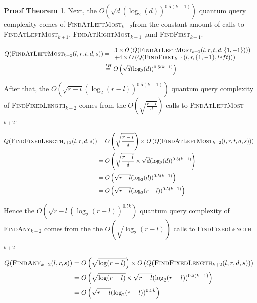 \documentclass[11pt,a4paper]{article}
\newcommand{\FA}[1]{\textsc{FindAny$_{#1}$}}
\newcommand{\FFL}[1]{\textsc{FindFixedLength$_{#1}$}}
\newcommand{\FALM}[1]{\textsc{FindAtLeftMost$_{#1}$}}
\newcommand{\FARM}[1]{\textsc{FindAtRightMost$_{#1}$}}
\newcommand{\FF}[1]{\textsc{FindFirst$_{#1}$}}
\theoremstyle{definition}
\theoremstyle{plain}
\theoremstyle{definition}
\newtheorem{tproof}{Proof Theorem}[section]
\begin{document}
\begin{appendix}
\begin{tproof}
{            Next, the $ O\left(\sqrt{d}(\log_2(d))^{0.5(k-1)} \right)$ quantum query complexity comes of \FALM{k+2}from the constant amount
            of calls to \FALM{k+1}, \FARM{k+1} ,and \FF{k+1}.

            \begin{align*}
                Q(\textrm{\FALM{k+2}}(l,r,t,d,s)) & = \begin{array}{l}
                    3 \times O\left(Q(\textrm{\FALM{k+1}}(l,r,t,d,\{1,-1\}))\right) \\
                    + 4 \times O\left(Q(\textrm{\FF{k+1}}(l,r,\{1,-1\},left))\right)
                \end{array}                                  \\
                                                  & \overset{IH}{=} O\left(\sqrt{d}(\log_2(d))^{0.5(k-1)} \right)
            \end{align*}

            After that, the $O\left( \sqrt{r-l}(\log_2(r-l))^{0.5(k-1)}\right)$ quantum query complexity of \FFL{k+2} comes from the
            $O\left(\sqrt{\frac{r-l}{d}}\right)$ calls to \FALM{k+2}.

            \begin{align*}
                Q(\textrm{\FFL{k+2}}(l, r, d, s)) & = O\left(\sqrt{\frac{r-l}{d}}\right) \times O\left(Q(\textrm{\FALM{k+2}}(l,r,t,d,s))\right) \\
                                                  & = O\left( \sqrt{\frac{r-l}{d}} \times \sqrt{d}(\log_2(d))^{0.5(k-1)}\right)                 \\
                                                  & = O\left( \sqrt{r-l}(\log_2(d))^{0.5(k-1)}\right)                                           \\
                                                  & = O\left( \sqrt{r-l}(\log_2(r-l))^{0.5(k-1)}\right)
            \end{align*}

            Hence the $O\left( \sqrt{r-l}(\log_2(r-l))^{0.5k} \right)$ quantum query complexity of \FA{k+2} comes from the
            the $O\left(\sqrt{\log_2(r-l)}\right)$ calls to \FFL{k+2}

            \begin{align*}
                Q(\textrm{\FA{k+2}}(l, r, s)) & = O\left(\sqrt{\log(r-l)}\right) \times O\left(Q(\textrm{\FFL{k+2}}(l, r, d, s))\right) \\
                                              & = O\left( \sqrt{\log(r-l)} \times \sqrt{r-l}(\log_2(r-l))^{0.5(k-1)} \right)            \\
                                              & = O\left( \sqrt{r-l}(\log_2(r-l))^{0.5k} \right)                                        \\
            \end{align*}

}
\end{tproof}
\end{appendix}
\end{document}
